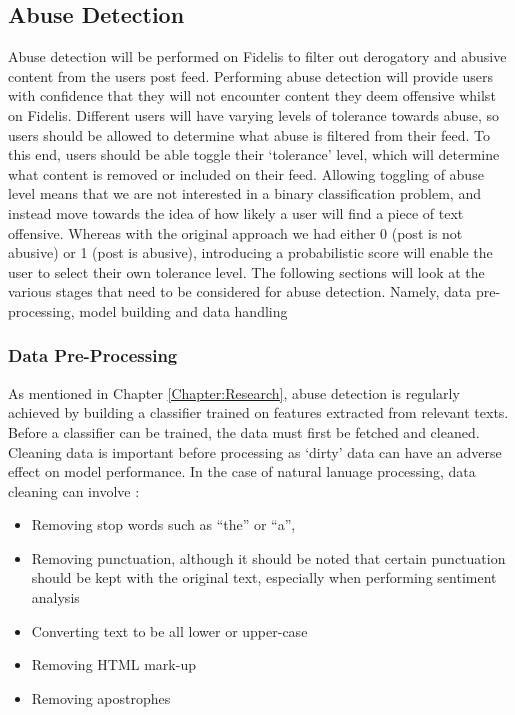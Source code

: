 \subsection{Abuse Detection}
Abuse detection will be performed on Fidelis to filter out derogatory and abusive content from the users post feed. Performing abuse detection will provide users with confidence that they will not encounter content they deem offensive whilst on Fidelis. Different users will have varying levels of tolerance towards abuse, so users should be allowed to determine what abuse is filtered from their feed. To this end, users should be able toggle their `tolerance' level, which will determine what content is removed or included on their feed. Allowing toggling of abuse level means that we are not interested in a binary classification problem, and instead move towards the idea of how likely a user will find a piece of text offensive. Whereas with the original approach we had either 0 (post is not abusive) or 1 (post is abusive), introducing a probabilistic score will enable the user to select their own tolerance level. The following sections will look at the various stages that need to be considered for abuse detection. Namely, data pre-processing, model building and data handling

\subsubsection{Data Pre-Processing}
As mentioned in Chapter \ref{Chapter:Research}, abuse detection is regularly achieved by building a classifier trained on features extracted from relevant texts. Before a classifier can be trained, the data must first be fetched and cleaned. Cleaning data is important before processing as `dirty' data can have an adverse effect on model performance. In the case of natural lanuage processing, data cleaning can involve \cite{han2011data}:
\begin{itemize}
\item Removing stop words such as ``the'' or ``a'', 
\item Removing punctuation, although it should be noted that certain punctuation should be kept with the original text, especially when performing sentiment analysis
\item Converting text to be all lower or upper-case
\item Removing HTML mark-up
\item Removing apostrophes
\end{itemize}

